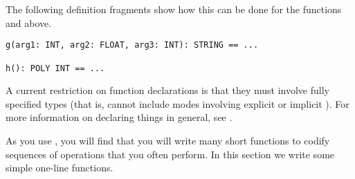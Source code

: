 The following definition fragments show how this can be done for
the functions  and  above.
\begin{verbatim}
g(arg1: INT, arg2: FLOAT, arg3: INT): STRING == ...

h(): POLY INT == ...
\end{verbatim}

A current restriction on function declarations is that they must
involve fully specified types (that is, cannot include modes involving
explicit or implicit ).
For more information on declaring things in general, see
.


As you use \Language{}, you will find that you will write many short functions
to codify sequences of operations that you often perform.
In this section we write some simple one-line functions.

